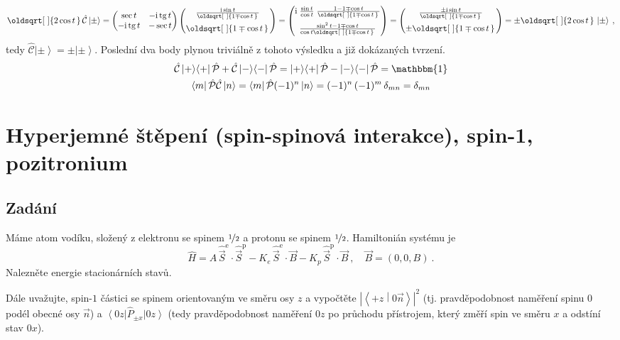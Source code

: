 \documentclass[10pt,a4paper]{article}
\renewcommand*{\sqrt}[2][\ ]{\oldsqrt[#1]{#2\,}\,}
\newcommand{\const}[1]{\text{#1}}
\newcommand{\mat}[1]{
    \begin{pmatrix}
        #1
    \end{pmatrix}
}
\newcommand{\bra}[1]{\left< #1 \right|}
\newcommand{\ket}[1]{\left| #1 \right>}
\newcommand{\braket}[2]{\left< #1 \middle| #2 \right>}
\renewcommand{\i}{\const{i}}
\newcommand{\vechat}[1]{\hat{\vec{#1}}}
\def\tg{\operatorname{tg}}
\def\1{\mathbbm{1}}
\def\Parity{\hat{\mathcal P}}
\def\Cop{\hat{\mathcal C}}
\begin{document}
\begin{align*}
    \sqrt{2\cos t} \Cop \ket\pm
    =
    \mat{
        \sec t & -\i\tg t \\
        -\i\tg t & -\sec t
    }
    \mat{
        \frac{\i \sin t}{\sqrt{1 \mp \cos t}} \\[7pt]
        \sqrt{1 \mp \cos t}
    }
    =
    \mat{
        \i \; \frac{\sin t}{\cos t} \; \frac{1 - 1 \mp \cos t}{\sqrt{1 \mp \cos t}} \\[7pt]
        \frac{\sin^2 t - 1 \mp \cos t}{\cos t \sqrt{1 \mp \cos t}}
    }
    =
    \mat{
        \frac{\pm \i \sin t}{\sqrt{1 \mp \cos t}} \\[7pt]
        \pm \sqrt{1 \mp \cos t}
    }
    =
    \pm \sqrt{2\cos t} \ket\pm \: ,
\end{align*}
tedy $\Cop\ket\pm=\pm\ket\pm$. Poslední dva body plynou triviálně z tohoto výsledku a již dokázaných tvrzení.
\begin{gather*}
    \Cop\ket{+}\!\bra{+}\Parity + \Cop\ket{-}\!\bra{-}\Parity
    = \ket{+}\!\bra{+}\Parity - \ket{-}\!\bra{-}\Parity = \1
    \\
    \bra{m} \Parity \Cop \ket{n} = \bra{m} \Parity (-1)^n \ket{n} = (-1)^n \, (-1)^m \, \delta_{mn} = \delta_{mn}
\end{gather*}


\section{Hyperjemné štěpení (spin-spinová interakce), spin-1, pozitronium}
\subsection{Zadání}
Máme atom vodíku, složený z elektronu se spinem $\nicefrac{1}{2}$ a protonu se spinem $\nicefrac{1}{2}$. Hamiltonián systému je
\begin{equation*}
    \hat H
    = A \, \vechat S^\const{e} \!\cdot\! \vechat S^\const{p}
    - K_e \, \vechat S^\const{e} \!\cdot\! \vec B
    - K_p \, \vechat S^\const{p} \!\cdot\! \vec B
    \: , \quad
    \vec B = (0, 0, B)
    \: .
\end{equation*}
Nalezněte energie stacionárních stavů.

Dále uvažujte, spin-$1$ částici se spinem orientovaným ve směru osy $z$ a vypočtěte $\left| \braket{+z}{0 \vec{n}} \right|^2$ (tj. pravděpodobnost naměření spinu $0$ podél obecné osy $\vec n$) a $\bra{0z} \hat P_{\pm x} \ket{0z}$ (tedy pravděpodobnost naměření $0z$ po průchodu přístrojem, který změří spin ve směru $x$ a odstíní stav $0x$).
\end{document}
